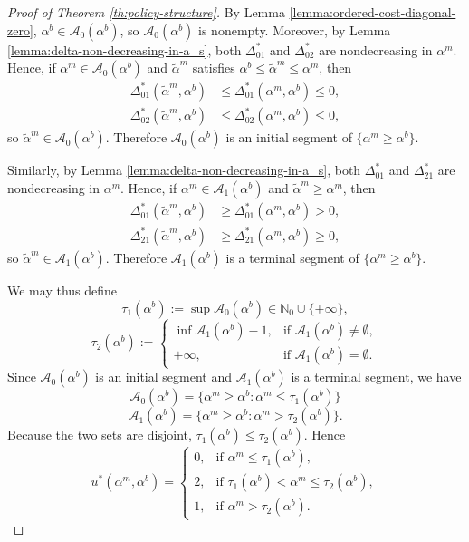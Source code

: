 \documentclass[letterpaper,journal]{IEEEtran}
\begin{document}
\begin{proof}[Proof of Theorem \ref{th:policy-structure}]
By Lemma \ref{lemma:ordered-cost-diagonal-zero}, $\alpha^b\in\mathcal A_0(\alpha^b)$, so $\mathcal A_0(\alpha^b)$ is nonempty. Moreover, by Lemma \ref{lemma:delta-non-decreasing-in-a_s}, both $\Delta^*_{01}$ and $\Delta^*_{02}$ are nondecreasing in $\alpha^m$. Hence, if $\alpha^m\in\mathcal A_0(\alpha^b)$ and $\tilde\alpha^m$ satisfies $\alpha^b\le \tilde\alpha^m\le \alpha^m$, then
\begin{align*}
\Delta^*_{01}(\tilde\alpha^m,\alpha^b)
&\le \Delta^*_{01}(\alpha^m,\alpha^b)\le 0,\\
\Delta^*_{02}(\tilde\alpha^m,\alpha^b)
&\le \Delta^*_{02}(\alpha^m,\alpha^b)\le 0,
\end{align*}
so $\tilde\alpha^m\in\mathcal A_0(\alpha^b)$. Therefore $\mathcal A_0(\alpha^b)$ is an initial
segment of $\{\alpha^m\ge \alpha^b\}$.

Similarly, by Lemma \ref{lemma:delta-non-decreasing-in-a_s}, both
$\Delta^*_{01}$ and $\Delta^*_{21}$ are nondecreasing in
$\alpha^m$. Hence, if $\alpha^m\in\mathcal A_1(\alpha^b)$ and $\tilde\alpha^m\ge \alpha^m$, then
\begin{align*}
\Delta^*_{01}(\tilde\alpha^m,\alpha^b)
&\ge \Delta^*_{01}(\alpha^m,\alpha^b)>0,\\
\Delta^*_{21}(\tilde\alpha^m,\alpha^b)
&\ge \Delta^*_{21}(\alpha^m,\alpha^b)\ge 0,
\end{align*}
so $\tilde\alpha^m\in\mathcal A_1(\alpha^b)$. Therefore $\mathcal A_1(\alpha^b)$ is a terminal
segment of $\{\alpha^m\ge \alpha^b\}$.

We may thus define
\[
\tau_1(\alpha^b):=\sup \mathcal A_0(\alpha^b)\in \mathbb N_0\cup\{+\infty\},
\]
\[
\tau_2(\alpha^b):=
\begin{cases}
\inf \mathcal A_1(\alpha^b)-1, & \text{if } \mathcal A_1(\alpha^b)\neq\emptyset,\\
+\infty, & \text{if } \mathcal A_1(\alpha^b)=\emptyset.
\end{cases}
\]
Since $\mathcal A_0(\alpha^b)$ is an initial segment and $\mathcal A_1(\alpha^b)$ is a terminal
segment, we have
\[
\mathcal A_0(\alpha^b)=\{\alpha^m\ge \alpha^b:\alpha^m\le \tau_1(\alpha^b)\}
\]
\[
\mathcal A_1(\alpha^b)=\{\alpha^m\ge \alpha^b:\alpha^m>\tau_2(\alpha^b)\}.
\]
Because the two sets are disjoint, $\tau_1(\alpha^b)\le \tau_2(\alpha^b)$. Hence
\[
u^*(\alpha^m,\alpha^b)=
\begin{cases}
0, & \text{if } \alpha^m\le \tau_1(\alpha^b),\\
2, & \text{if } \tau_1(\alpha^b)<\alpha^m\le \tau_2(\alpha^b),\\
1, & \text{if } \alpha^m>\tau_2(\alpha^b).
\end{cases}
\]


\end{proof}
\end{document}
